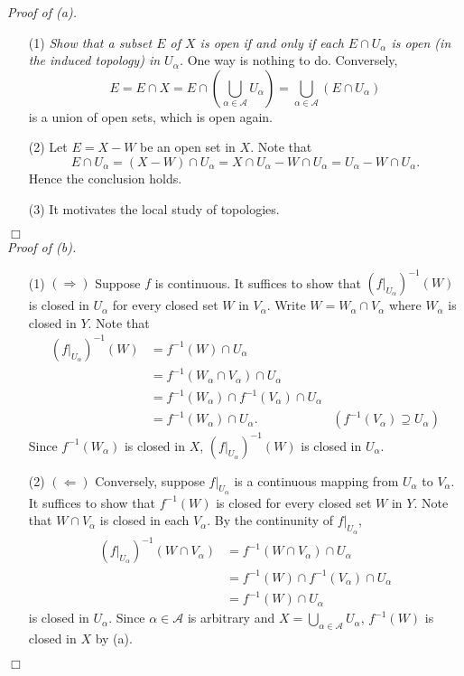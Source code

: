 \documentclass{article}
\begin{document}
\emph{Proof of (a).}
\begin{enumerate}
\item[(1)]
  \emph{Show that a subset $E$ of $X$ is open if and only if
  each $E \cap U_{\alpha}$ is open (in the induced topology) in $U_{\alpha}$.}
  One way is nothing to do.
  Conversely,
  \[
    E
    = E \cap X
    = E \cap \left( \bigcup_{\alpha \in \mathscr{A}} U_{\alpha} \right)
    = \bigcup_{\alpha \in \mathscr{A}} (E \cap U_{\alpha})
  \]
  is a union of open sets, which is open again.

\item[(2)]
  Let $E = X - W$ be an open set in $X$.
  Note that
  \[
    E \cap U_{\alpha}
    = (X - W) \cap U_{\alpha}
    = X \cap U_{\alpha} - W \cap U_{\alpha}
    = U_{\alpha} - W \cap U_{\alpha}.
  \]
  Hence the conclusion holds.

\item[(3)]
  It motivates the local study of topologies.
\end{enumerate}
$\Box$ \\



\emph{Proof of (b).}
\begin{enumerate}
\item[(1)]
  $(\Longrightarrow)$
  Suppose $f$ is continuous.
  It suffices to show that
  $(f|_{U_{\alpha}})^{-1}(W)$ is closed in $U_{\alpha}$ for every closed set $W$ in $V_{\alpha}$.
  Write $W = W_{\alpha} \cap V_{\alpha}$ where $W_{\alpha}$ is closed in $Y$.
  Note that
  \begin{align*}
    (f|_{U_{\alpha}})^{-1}(W)
    &= f^{-1}(W) \cap U_{\alpha} \\
    &= f^{-1}(W_{\alpha} \cap V_{\alpha}) \cap U_{\alpha} \\
    &= f^{-1}(W_{\alpha}) \cap f^{-1}(V_{\alpha}) \cap U_{\alpha} \\
    &= f^{-1}(W_{\alpha}) \cap U_{\alpha}.
      &(f^{-1}(V_{\alpha}) \supseteq U_{\alpha})
  \end{align*}
  Since $f^{-1}(W_{\alpha})$ is closed in $X$,
  $(f|_{U_{\alpha}})^{-1}(W)$ is closed in $U_{\alpha}$.

\item[(2)]
  $(\Longleftarrow)$
  Conversely, suppose $f|_{U_{\alpha}}$ is a continuous mapping from $U_{\alpha}$ to $V_{\alpha}$.
  It suffices to show that
  $f^{-1}(W)$ is closed for every closed set $W$ in $Y$.
  Note that $W \cap V_{\alpha}$ is closed in each $V_{\alpha}$.
  By the continunity of $f|_{U_{\alpha}}$,
  \begin{align*}
    (f|_{U_{\alpha}})^{-1}(W \cap V_{\alpha})
    &= f^{-1}(W \cap V_{\alpha}) \cap U_{\alpha} \\
    &= f^{-1}(W) \cap f^{-1}(V_{\alpha}) \cap U_{\alpha} \\
    &= f^{-1}(W) \cap U_{\alpha}
  \end{align*}
  is closed in $U_{\alpha}$.
  Since $\alpha \in \mathscr{A}$ is arbitrary and
  $X = \bigcup_{\alpha \in \mathscr{A}} U_{\alpha}$,
  $f^{-1}(W)$ is closed in $X$ by (a).
\end{enumerate}
$\Box$ \\\\
\end{document}
